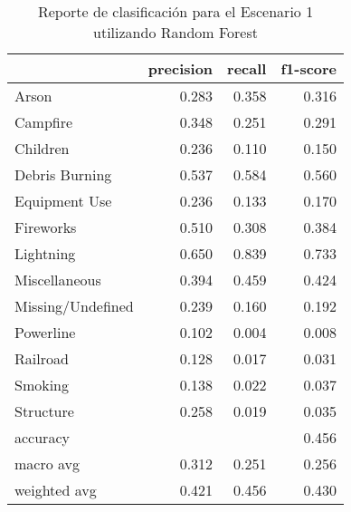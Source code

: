 \begin{table}
\centering
\caption{Reporte de clasificación para el Escenario 1 utilizando Random Forest}
\label{tab:RF_Escenario 1}
\begin{tabular}{lrrr}
\toprule
{} &  precision &  recall &  f1-score \\
\midrule
Arson             &      0.283 &   0.358 &     0.316 \\
Campfire          &      0.348 &   0.251 &     0.291 \\
Children          &      0.236 &   0.110 &     0.150 \\
Debris Burning    &      0.537 &   0.584 &     0.560 \\
Equipment Use     &      0.236 &   0.133 &     0.170 \\
Fireworks         &      0.510 &   0.308 &     0.384 \\
Lightning         &      0.650 &   0.839 &     0.733 \\
Miscellaneous     &      0.394 &   0.459 &     0.424 \\
Missing/Undefined &      0.239 &   0.160 &     0.192 \\
Powerline         &      0.102 &   0.004 &     0.008 \\
Railroad          &      0.128 &   0.017 &     0.031 \\
Smoking           &      0.138 &   0.022 &     0.037 \\
Structure         &      0.258 &   0.019 &     0.035 \\
accuracy          &            &         &     0.456 \\
macro avg         &      0.312 &   0.251 &     0.256 \\
weighted avg      &      0.421 &   0.456 &     0.430 \\
\bottomrule
\end{tabular}
\end{table}
